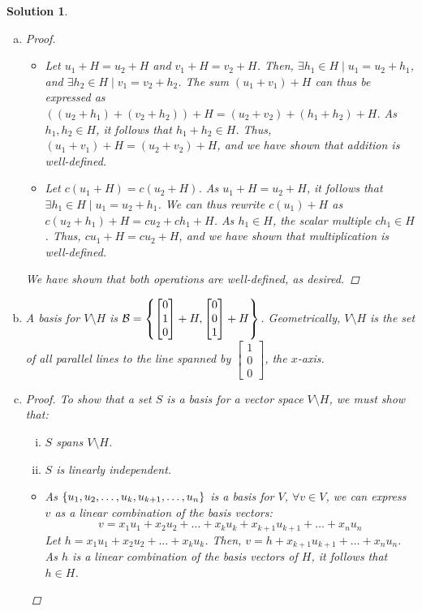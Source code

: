 \documentclass[11pt]{scrartcl}
\theoremstyle{dotlessP}
\newtheorem{sol}{Solution}[section]
\theoremstyle{dotlessN}
\DeclarePairedDelimiter\set{\{}{\}}
\newcommand{\basis}{\mathcal{B}}
\begin{document}
\begin{sol} \
	\begin{enumerate}[a)]
		\item 	
			\begin{proof}\
				\begin{itemize}
					\item Let $u_1 + H = u_2 + H$ and $v_1 + H = v_2 + H$. Then, $\exists h_1 \in H \mid u_1 = u_2 + h_1$, and $\exists h_2 \in H \mid v_1 = v_2 + h_2$. The sum $(u_1 + v_1) + H$ can thus be expressed as  $((u_2 + h_1) + (v_2 + h_2)) + H = (u_2 + v_2) + (h_1 + h_2) + H$. As $h_1, h_2 \in H$, it follows that $h_1 + h_2 \in H$. Thus, $(u_1 + v_1) + H = (u_2 + v_2) + H$, and we have shown that addition is well-defined.
					\item Let $c(u_1 + H) = c(u_2 + H)$. As $u_1 + H = u_2 + H$, it follows that $\exists h_1 \in H \mid u_1 = u_2 + h_1$. We can thus rewrite $c(u_1) + H$ as $c(u_2 + h_1) + H = cu_2 + ch_1 + H$. As $h_1 \in H$, the scalar multiple $ch_1 \in H$. Thus, $cu_1 + H = cu_2 + H$, and we have shown that multiplication is well-defined.
				\end{itemize}
				We have shown that both operations are well-defined, as desired.
			\end{proof}
		\item A basis for $V \setminus H$ is $\basis = \set*{
				\begin{bmatrix}
			0 \\
			1 \\
			0
				\end{bmatrix} + H,
				\begin{bmatrix}
					0 \\
					0 \\
					1
				\end{bmatrix} + H
			}$. Geometrically, $V \setminus H$ is the set of all parallel lines to the line spanned by $
\begin{bmatrix}
	1 \\
	0 \\
	0
\end{bmatrix}
			$, the $x$-axis.
		\item 
			\begin{proof}
				To show that a set $S$ is a basis for a vector space $V \setminus H$, we must show that:
				\begin{enumerate}[(i)]
					\item $S$ spans $V \setminus H$.
					\item  $S$ is linearly independent.
				\end{enumerate}
				\begin{itemize}
					\item As $\set*{u_1, u_2, \dots, u_k, u_{k+1}, \dots, u_n}$ is a basis for $V$, $\forall v \in V$, we can express $v$ as a linear combination of the basis vectors:
						\[
							v = x_1u_1 + x_2 u_2 + \dots + x_k u_k + x_{k+1}u_{k+1} + \dots + x_n u_n
						\] 
						Let $h = x_1 u_1 + x_2 u_2 + \dots + x_k u_k$. Then, $v = h + x_{k+1}u_{k+1} + \dots + x_n u_n$. As $h$ is a linear combination of the basis vectors of $H$, it follows that $h \in H$.
						

\end{itemize}
\end{proof}
\end{enumerate}
\end{sol}
\end{document}
